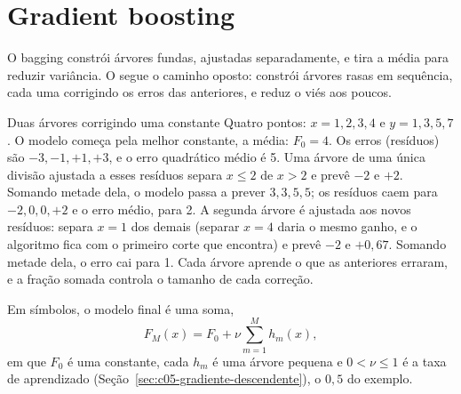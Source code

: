 \section{Gradient boosting}
\label{sec:c13-boosting}

O bagging constrói árvores fundas, ajustadas separadamente, e tira a média para reduzir variância. O  segue o caminho oposto: constrói árvores rasas em sequência, cada uma corrigindo os erros das anteriores, e reduz o viés aos poucos.

\begin{exemplo}{Duas árvores corrigindo uma constante}
Quatro pontos: $x = 1, 2, 3, 4$ e $y = 1, 3, 5, 7$. O modelo começa pela melhor constante, a média: $F_0 = 4$. Os erros (resíduos) são $-3, -1, +1, +3$, e o erro quadrático médio é 5. Uma árvore de uma única divisão ajustada a esses resíduos separa $x \le 2$ de $x > 2$ e prevê $-2$ e $+2$. Somando metade dela, o modelo passa a prever $3, 3, 5, 5$; os resíduos caem para $-2, 0, 0, +2$ e o erro médio, para 2. A segunda árvore é ajustada aos novos resíduos: separa $x = 1$ dos demais (separar $x = 4$ daria o mesmo ganho, e o algoritmo fica com o primeiro corte que encontra) e prevê $-2$ e $+0,67$. Somando metade dela, o erro cai para 1. Cada árvore aprende o que as anteriores erraram, e a fração somada controla o tamanho de cada correção.
\end{exemplo}

Em símbolos, o modelo final é uma soma,
\begin{equation}
  F_M(x) = F_0 + \nu \sum_{m=1}^{M} h_m(x) ,
  \label{eq:c13-aditivo}
\end{equation}
em que $F_0$ é uma constante, cada $h_m$ é uma árvore pequena e $0 < \nu \le 1$ é a taxa de aprendizado (Seção~\ref{sec:c05-gradiente-descendente}), o $0,5$ do exemplo.

